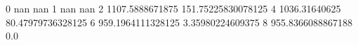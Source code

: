 0 nan nan
1 nan nan
2 1107.5888671875 151.75225830078125
4 1036.31640625 80.47979736328125
6 959.1964111328125 3.35980224609375
8 955.8366088867188 0.0
